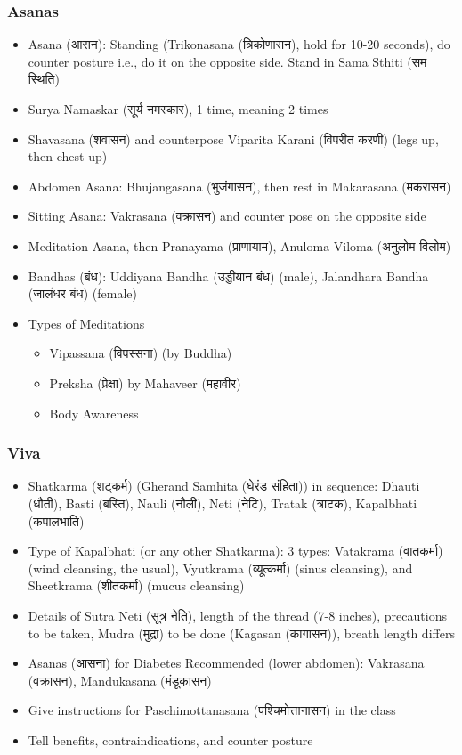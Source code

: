 \begin{frame}[fragile]\frametitle{Asanas}
    \begin{itemize}
        \item Asana (आसन): Standing (Trikonasana (त्रिकोणासन), hold for 10-20 seconds), do counter posture i.e., do it on the opposite side. Stand in Sama Sthiti (सम स्थिति)
        \item Surya Namaskar (सूर्य नमस्कार), 1 time, meaning 2 times
        \item Shavasana (शवासन) and counterpose Viparita Karani (विपरीत करणी) (legs up, then chest up)
        \item Abdomen Asana: Bhujangasana (भुजंगासन), then rest in Makarasana (मकरासन)
        \item Sitting Asana: Vakrasana (वक्रासन) and counter pose on the opposite side
        \item Meditation Asana, then Pranayama (प्राणायाम), Anuloma Viloma (अनुलोम विलोम)
        \item Bandhas (बंध): Uddiyana Bandha (उड्डीयान बंध) (male), Jalandhara Bandha (जालंधर बंध) (female)
		\item Types of Meditations
			\begin{itemize}
				\item Vipassana (विपस्सना) (by Buddha)
				\item Preksha (प्रेक्षा) by Mahaveer (महावीर)
				\item Body Awareness
			\end{itemize}
    \end{itemize}
		
\end{frame}


\begin{frame}[fragile]\frametitle{Viva}
    \begin{itemize}
        \item Shatkarma (शट्कर्म) (Gherand Samhita (घेरंड संहिता)) in sequence: Dhauti (धौती), Basti (बस्ति), Nauli (नौली), Neti (नेटि), Tratak (त्राटक), Kapalbhati (कपालभाति)
        \item Type of Kapalbhati (or any other Shatkarma): 3 types: Vatakrama (वातकर्मा) (wind cleansing, the usual), Vyutkrama (व्यूत्कर्मा) (sinus cleansing), and Sheetkrama (शीतकर्मा) (mucus cleansing)
        \item Details of Sutra Neti (सूत्र नेति), length of the thread (7-8 inches), precautions to be taken, Mudra (मुद्रा) to be done (Kagasan (कागासन)), breath length differs
        \item Asanas (आसना) for Diabetes Recommended (lower abdomen): Vakrasana (वक्रासन), Mandukasana (मंडूकासन)
        \item Give instructions for Paschimottanasana (पश्चिमोत्तानासन) in the class
        \item Tell benefits, contraindications, and counter posture
    \end{itemize}
\end{frame}

